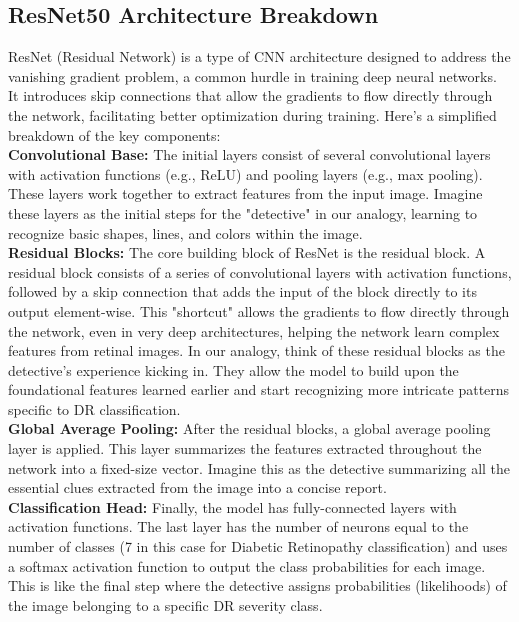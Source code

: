 \documentclass[conference]{IEEEtran}
\begin{document}
\subsection{ResNet50 Architecture Breakdown}

ResNet (Residual Network) is a type of CNN architecture designed to address the vanishing gradient problem, a common hurdle in training deep neural networks. It introduces skip connections that allow the gradients to flow directly through the network, facilitating better optimization during training. Here's a simplified breakdown of the key components:\\

\textbf{Convolutional Base:}
The initial layers consist of several convolutional layers with activation functions (e.g., ReLU) and pooling layers (e.g., max pooling). These layers work together to extract features from the input image. Imagine these layers as the initial steps for the "detective" in our analogy, learning to recognize basic shapes, lines, and colors within the image.\\

\textbf{Residual Blocks:}
The core building block of ResNet is the residual block. A residual block consists of a series of convolutional layers with activation functions, followed by a skip connection that adds the input of the block directly to its output element-wise. This "shortcut" allows the gradients to flow directly through the network, even in very deep architectures, helping the network learn complex features from retinal images. In our analogy, think of these residual blocks as the detective's experience kicking in. They allow the model to build upon the foundational features learned earlier and start recognizing more intricate patterns specific to DR classification.\\

\textbf{Global Average Pooling:}
After the residual blocks, a global average pooling layer is applied. This layer summarizes the features extracted throughout the network into a fixed-size vector. Imagine this as the detective summarizing all the essential clues extracted from the image into a concise report.\\

\textbf{Classification Head:}
Finally, the model has fully-connected layers with activation functions. The last layer has the number of neurons equal to the number of classes (7 in this case for Diabetic Retinopathy classification) and uses a softmax activation function to output the class probabilities for each image. This is like the final step where the detective assigns probabilities (likelihoods) of the image belonging to a specific DR severity class.\\
\end{document}
